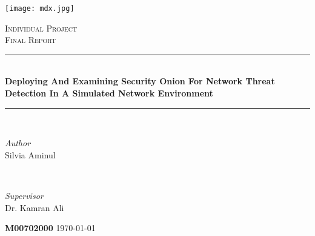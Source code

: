 \documentclass[12pt]{article}
\begin{document}
	
	
	\fancyhead{} %
	\fancyfoot{} %
	\fancyfoot[CO]{\thepage}
	\begin{titlepage}	
		\centering
		
		\newcommand{\HRule}{\rule{\linewidth}{0.7mm }} %
		\newcommand{\Botline}{\rule{\linewidth}{0.4mm }} %
		
		
		\texttt{[image: mdx.jpg]}
		
		\textsc{\Large Individual Project }\\[0.5cm] %
		
		\textsc{\large Final Report}\\[0.5cm] %
		
		
		\HRule\\[0.4cm]
		
		{\huge\bfseries Deploying And Examining Security Onion For Network Threat Detection In A Simulated Network Environment}\\[0.4cm] %
		
		\Botline\\[1.5cm]
		
		
		\begin{minipage}{0.4\textwidth}
			\begin{flushleft}
				\large
				\textit{Author}\\
				Silvia Aminul 
			\end{flushleft}
		\end{minipage}
		~
		\begin{minipage}{0.4\textwidth}
			\begin{flushright}
				\large
				\textit{Supervisor}\\
				Dr. Kamran Ali  
			\end{flushright}
			
			
		\end{minipage}
		
		
		\vfill\vfill\vfill
		
		\vfill
		
		
		
		{\bfseries M00702000 }
		\vfill
		{\large\today}
	\end{titlepage}	
	\newpage
\end{document}
